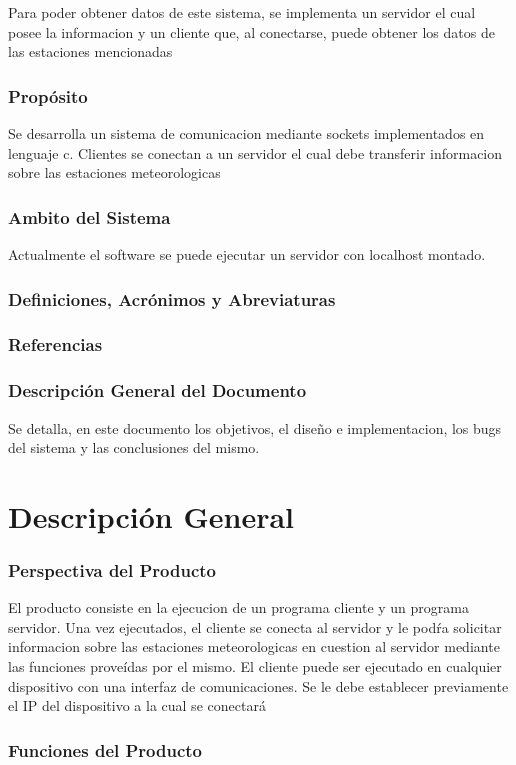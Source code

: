 \documentclass[10pt, a4paper,notitlepage]{article}
\begin{document}
Para poder obtener datos de este sistema, se implementa un servidor el cual posee la informacion y un cliente que, al conectarse, puede obtener los datos de las estaciones mencionadas
\subsubsection{Propósito}
Se desarrolla un sistema de comunicacion mediante sockets implementados en lenguaje c. Clientes se conectan a un servidor el cual debe transferir informacion sobre las estaciones meteorologicas
\subsubsection{Ambito del Sistema}
Actualmente el software se puede ejecutar un servidor con localhost montado.




\subsubsection{Definiciones, Acrónimos y Abreviaturas} 
\subsubsection{Referencias}

\subsubsection{Descripción General del Documento}
Se detalla, en este documento los objetivos, el diseño e implementacion, los bugs del sistema y las conclusiones del mismo.
\section{Descripción General}
\subsubsection{Perspectiva del Producto }
El producto consiste en la ejecucion de un programa cliente y un programa servidor.
Una vez ejecutados, el cliente se conecta al servidor y le podŕa solicitar informacion sobre las estaciones meteorologicas en cuestion al servidor mediante las funciones proveídas por el mismo.
El cliente puede ser ejecutado en cualquier dispositivo con una interfaz de comunicaciones. Se le debe establecer previamente el IP del dispositivo a la cual se conectará
\subsubsection{Funciones del Producto}
\end{document}
